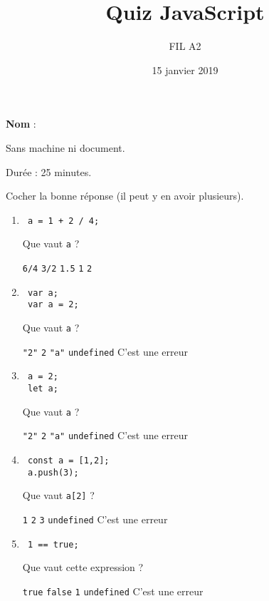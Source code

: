 \documentclass[a4paper, 12pt]{article}
\title{Quiz JavaScript}
\author{FIL A2}
\date{15 janvier 2019}
\newcommand{\choice}[1]{\Square\hspace{2pt} #1\hspace{5pt}}
\newcommand{\choicec}[1]{\Square\hspace{2pt} \lstinline{#1}\hspace{5pt}}
\begin{document}
\maketitle

\textbf{Nom} :

Sans machine ni document.

Durée : 25 minutes.

Cocher la bonne réponse (il peut y en avoir plusieurs).

\begin{enumerate}
\item \lstset{language=javascript}
\begin{lstlisting}
 a = 1 + 2 / 4;
\end{lstlisting}

  Que vaut \lstinline{a} ?

  \choicec{6/4} \choicec{3/2} \choicec{1.5} \choicec{1} \choicec{2}

\item \lstset{language=javascript}
\begin{lstlisting}
 var a;
 var a = 2;
\end{lstlisting}

  Que vaut \lstinline{a} ?

  \choicec{"2"} \choicec{2} \choicec{"a"} \choicec{undefined} \choice{C'est une erreur}
\item \lstset{language=javascript}
\begin{lstlisting}
 a = 2;
 let a;
\end{lstlisting}

  Que vaut \lstinline{a} ?

  \choicec{"2"} \choicec{2} \choicec{"a"} \choicec{undefined} \choice{C'est une erreur}
\item \lstset{language=javascript}
\begin{lstlisting}
 const a = [1,2];
 a.push(3);
\end{lstlisting}

  Que vaut \lstinline{a[2]} ?

  \choicec{1} \choicec{2} \choicec{3} \choicec{undefined} \choice{C'est une erreur}
\item \lstset{language=javascript}
\begin{lstlisting}
 1 == true;
\end{lstlisting}

  Que vaut cette expression ?

  \choicec{true} \choicec{false} \choicec{1} \choicec{undefined} \choice{C'est une erreur}


\end{enumerate}
\end{document}
